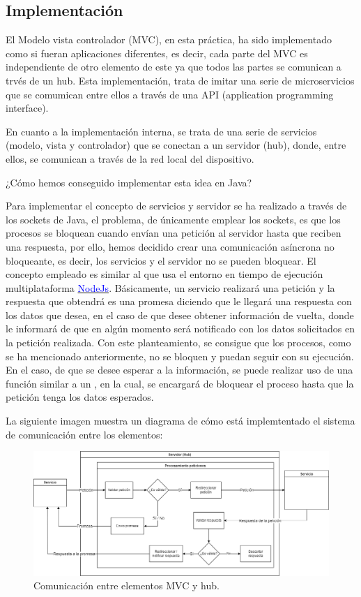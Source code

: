 \subsection{Implementación}

El Modelo vista controlador (MVC), en esta práctica, ha sido implementado como si fueran aplicaciones diferentes, es decir, cada parte del MVC es independiente de otro elemento de este ya que todos las partes se comunican a trvés de un hub. Esta implementación, trata de imitar una serie de microservicios que se comumican entre ellos a través de una API (application programming interface).\bigskip

En cuanto a la implementación interna, se trata de una serie de servicios (modelo, vista y controlador) que se conectan a un servidor (hub), donde, entre ellos, se comunican a través de la red local del dispositivo.\bigskip

¿Cómo hemos conseguido implementar esta idea en Java?\bigskip

Para implementar el concepto de servicios y servidor se ha realizado a través de los sockets de Java, el problema, de únicamente emplear los sockets, es que los procesos se bloquean cuando envían una petición al servidor hasta que reciben una respuesta, por ello, hemos decidido crear una comunicación asíncrona no bloqueante, es decir, los servicios y el servidor no se pueden bloquear. El concepto empleado es similar al que usa el entorno en tiempo de ejecución multiplataforma \href{https://nodejs.org/en}{\textcolor{blue}{NodeJs}}. Básicamente, un servicio realizará una petición y la respuesta que obtendrá es una promesa diciendo que le llegará una respuesta con los datos que desea, en el caso de que desee obtener información de vuelta, donde le informará de que en algún momento será notificado con los datos solicitados en la petición realizada. Con este planteamiento, se consigue que los procesos, como se ha mencionado anteriormente, no se bloquen y puedan seguir con su ejecución. En el caso, de que se desee esperar a la información, se puede realizar uso de una función similar a un , en la cual, se encargará de bloquear el proceso hasta que la petición tenga los datos esperados.\bigskip

La siguiente imagen muestra un diagrama de cómo está implemtentado el sistema de comunicación entre los elementos:

\begin{figure}[!h]
    \centering
    \includegraphics[width=\linewidth]{MVC/img/comunicacion.png}
    \caption{Comunicación entre elementos MVC y hub.}
    \label{fig:comuncacion mvc}
\end{figure}


